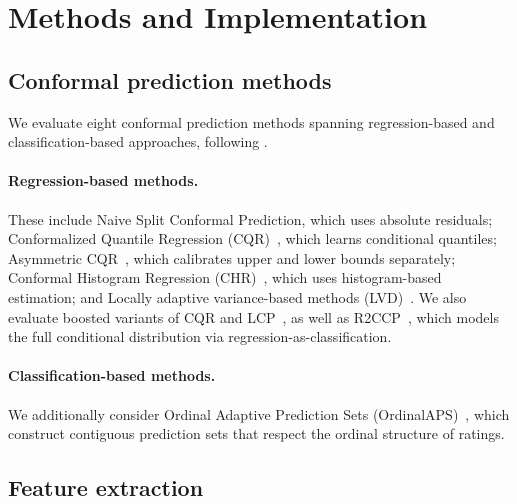 \documentclass{article}
\begin{document}



\appendix

\section{Methods and Implementation}
\label{app:methods}

\subsection{Conformal prediction methods}
\label{sec:appendix_cp_methods}

We evaluate eight conformal prediction methods spanning regression-based and classification-based approaches, following \citet{sheng2025analyzing}.

\paragraph{Regression-based methods.}
These include Naive Split Conformal Prediction, which uses absolute residuals; Conformalized Quantile Regression (CQR)~\citep{romano2019conformalized}, which learns conditional quantiles; Asymmetric CQR~\citep{sesia2020comparison}, which calibrates upper and lower bounds separately; Conformal Histogram Regression (CHR)~\citep{sesia2021conformal}, which uses histogram-based estimation; and Locally adaptive variance-based methods (LVD)~\citep{lin2021locally}. We also evaluate boosted variants of CQR and LCP~\citep{xie2024boosted}, as well as R2CCP~\citep{guha2024conformal}, which models the full conditional distribution via regression-as-classification.

\paragraph{Classification-based methods.}
We additionally consider Ordinal Adaptive Prediction Sets (OrdinalAPS)~\citep{lu2022fair}, which construct contiguous prediction sets that respect the ordinal structure of ratings.

\subsection{Feature extraction}
\label{app:feature_extraction}
\end{document}
